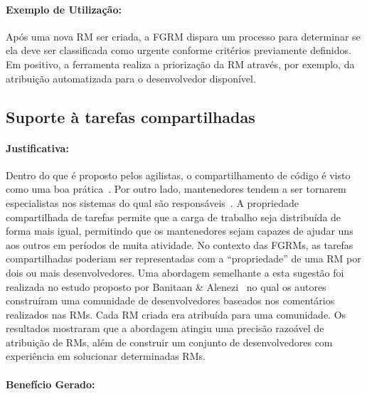 \paragraph{Exemplo de Utilização:}
\label{par:exemplo_de_utilização_s07}

Após uma nova RM ser criada, a FGRM dispara um processo para determinar se ela
deve ser classificada como urgente conforme critérios previamente definidos. Em
positivo, a ferramenta realiza a priorização da RM através, por exemplo, da
atribuição automatizada para o desenvolvedor disponível.

\subsection{Suporte à tarefas compartilhadas}
\label{sub:suporte_tarefas_compartilhadas}


\paragraph{Justificativa:}
\label{par:justificativa_s08}

Dentro do que é proposto pelos agilistas, o compartilhamento de código é visto
como uma boa prática~\cite{meyer2014agile}. Por outro lado, mantenedores tendem
a ser tornarem especialistas nos sistemas do qual são
responsáveis~\cite{singer1998practices}. A propriedade compartilhada de tarefas
permite que a carga de trabalho seja distribuída de forma mais igual, permitindo
que os mantenedores sejam capazes de ajudar uns aos outros em períodos de muita
atividade. No contexto das FGRMs, as tarefas compartilhadas poderiam ser
representadas com a ``propriedade'' de uma RM por dois ou mais desenvolvedores.
Uma abordagem semelhante a esta sugestão foi realizada no estudo proposto por
Banitaan \& Alenezi~\cite{banitaan2013decoba} no qual os autores construíram uma
comunidade de desenvolvedores baseados nos comentários realizados nas RMs. Cada
RM criada era atribuída para uma comunidade. Os resultados mostraram que a
abordagem atingiu uma precisão razoável de atribuição de RMs, além de construir
um conjunto de desenvolvedores com experiência em solucionar determinadas RMs.

\paragraph{Benefício Gerado:}
\label{par:papéis_afetados_s08}

